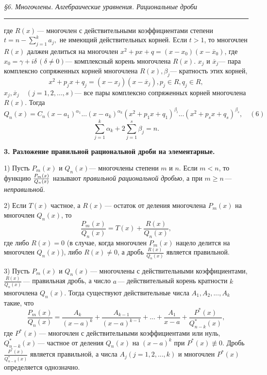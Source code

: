 \documentclass[a5paper, 16pt]{book}
\begin{document}
    \setcounter{page}{49}
    \begin{center}
        \begin{spacing}
            \small{\textit{\S6. Многочлены. Алгебраические уравнения. Рациональные дроби}}
            \noindent\rule{\textwidth}{1pt}
		\end{spacing}
    \end{center}
    где $R(x) \, \textbf{---}$ многочлен с действительными коэффициентами степени $t = n - \sum_{j = 1} ^ {k} a_j,$ не имеющий действительных корней. Если $t > 1$, то многочлен $R(x)$ далжен делиться на многочлен $x ^ {2} + px + q = (x - x_0)(x - \overline{x}_0)$, где $x_0 = \gamma + i\delta \, (\delta \neq 0) \textbf{---}$ комплексный корень многочлена $R(x).$
     $x_j$ и $\overline{x}_j \textbf{---}$ пара комплексно сопряженных корней многочлена $R(x), \beta _j \textbf{---}$ кратность этих корней,
    $$x ^ {2} + p_j x + q_j = (x - x_j)(x - \overline{x}_j), p_j \in R, q_j \in R,$$
    $x_j, \overline{x}_j \quad (j = 1,2,...,s) \textbf{---}$ все пары комплексно сопряженных корней многочлена $R(x).$ Тогда
    $$Q_n (x) = C_n (x - a_1)^{\alpha_1} ... (x - a_k)^{\alpha_k} (x^{2} + p_1 x + q_1)^{\beta_i} ... (x^{2} + p_s x + q_s)^{\beta_s} , \quad (6)$$
    $$\sum_{j = 1} ^ k \alpha_k + 2\sum_{j = 1} ^ s \beta_j = n.$$
    \par\textbf{3. Разложение правильной рациональной дроби на элементарные.}
    \par1) Пусть $P_m (x)$ и $Q_n (x) \textbf{---}$ многочлены степени $m$ и $n$. Если $m < n$, то функцию $\Large{\frac{P_m (x)}{Q_n (x)}}$ называют \textit{правильной рациональной дробью}, а при $m \geq n \, \textbf{---}$ \textit{неправильной}.
    \par2) Если $T(x)$ частное, а $R(x) \, \textbf{---}$ остаток от деления многочлена $P_m (x)$ на многочлен $Q_n (x)$, то
    $$\frac{P_m (x)}{Q_n (x)} = T(x) + \frac{R(x)}{Q_n (x)} ,$$
    где либо $R(x) = 0$ (в случае, когда многочлен $P_m (x)$ нацело делится на многочлен $Q_n (x)$), либо $R(x) \neq 0$, а дробь $\frac{R(x)}{Q_n (x)}$ является правильной.
    \par3) Пусть $P_m (x)$ и $Q_n (x) \, \textbf{---}$ многочлены с действительными коэффициентами, $\frac{R(x)}{Q_n (x)} \, \textbf{---}$ правильная дробь, а число $a \, \textbf{---}$ действительный корень кратности $k$ многочлена $Q_n (x)$. Тогда существуют действительные числа $A_1, A_2, ..., A_k$ такие, что 
    $$\frac{P_m (x)}{Q_n (x)} = \frac{A_k}{(x - a) ^ k} + \frac{A_{k - 1}}{(x - a) ^ {k - 1}} + ... + \frac{A_1}{x - a} + \frac{P^* (x)}{Q_{n - k} ^ * (x)} ,$$
    где $P ^ * (x) \, \textbf{---}$ многочлен с действительными коэффициентами или нуль, $Q_{n - k} ^ * (x) \, \textbf{---}$ частное от деления $Q_n (x)$ на $(x - a) ^ k$ при $P ^ * (x) \not\equiv 0.$ Дробь $\frac{P^* (x)}{Q_{n - k} ^ * (x)}$ является правильной, а числа $A_j (j = 1,2,...,k)$ и многочлен $P^* (x)$ определяется однозначно.
    
\end{document}
